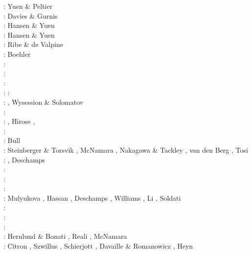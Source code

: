 \begin{scriptsize}
\nineteeneighty: Yuen \& Peltier \cite{yupe80}\\
\nineteeneightysix: Davies \& Gurnis \cite{dagu86}\\
\nineteeneightyeight: Hansen \& Yuen \cite{hayu88}\\
\nineteeneightynine: Hansen \& Yuen \cite{hayu89}\\
\nineteenninetyfour: Ribe \& de Valpine \cite{ride94}\\
\nineteenninetysix: Boehler \cite{boeh96}\\
\nineteenninetyseven: \cite{kell97}\\
\nineteenninetyeight: \cite{tack98b}\\
\twothousandone: \cite{soga01}\\
\twothousandtwo: \cite{somo02}\cite{tagh02}
\twothousandfour: \cite{mczh04}\cite{nata04}\\
\twothousandfive: \cite{mczh05a}\cite{nata05}\cite{nata05b}, Wysession \& Solomatov \cite{wyso05}\\
\twothousandsix: \cite{nata06}\\
\twothousandseven: \cite{heta07}\cite{moyu07}\cite{pelt07}, Hirose \etal \cite{hibl07}, \cite{yumc07}\\
\twothousandeight: \cite{gamc08}\cite{nata08}\cite{stho08}\\
\twothousandnine:  Bull \etal \cite{bumr09}\\
\twothousandten: Steinberger \& Torsvik \cite{stto10}, McNamara \etal \cite{mcgr10},
                 Nakagawa \& Tackley \cite{nata10}, van den Berg \etal \cite{vady10}, 
                 Tosi \etal \cite{toyc10}\\
\twothousandeleven: \cite{bowg11}\cite{talz11}\cite{vayj11}, Deschamps \etal \cite{dekt11}\\
\twothousandtwelve: \cite{stto12}\cite{dagd12}\cite{dect12}\\
\twothousandthirteen: \cite{limc13}\cite{bogs13a}\cite{bogs13b}\\
\twothousandfourteen: \cite{budt14}\cite{lidt14}\cite{tovd14}\\
\twothousandfifteen: Mulyukova \etal \cite{musd15}, Hassan \etal \cite{hafg15}, Deschamps \etal \cite{delt15},
                     Williams \etal \cite{wilm15}, Li \etal \cite{lidt15}, Soldati \etal \cite{sobd15}\\
\twothousandsixteen: \cite{dost16}\cite{tosa16}\\
\twothousandseventeen: \cite{hish17}\cite{lizh17}\\
\twothousandeighteen: \cite{daga18}\cite{lizo18}\cite{hect18}\cite{dert18}\\
\twothousandnineteen: Hernlund \& Bonati \cite{hebo19}, Reali \etal \cite{rejv19}, McNamara \cite{mcna19}\\
\twothousandtwenty: Citron \etal \cite{cilw20}, Szwillus \etal \cite{szes20}, Schierjott \etal \cite{scrt20},
                    Davaille \& Romanowicz \cite{daro20}, Heyn \etal \cite{hect20b}
\end{scriptsize}

